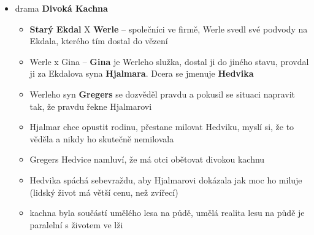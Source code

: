 \begin{itemize}
\item drama \textbf{Divoká Kachna}
	\begin{itemize}
	\item \textbf{Starý Ekdal} X \textbf{Werle} -- společníci ve firmě, Werle svedl své podvody na Ekdala, kterého tím dostal do vězení
	\item Werle x Gina -- \textbf{Gina} je Werleho služka, dostal ji do jiného stavu, provdal ji za Ekdalova syna \textbf{Hjalmara}. Dcera se jmenuje \textbf{Hedvika}
	\item Werleho syn \textbf{Gregers} se dozvěděl pravdu a pokusil se situaci napravit tak, že pravdu řekne Hjalmarovi
	\item Hjalmar chce opustit rodinu, přestane milovat Hedviku, myslí si, že to věděla a nikdy ho skutečně nemilovala
	\item Gregers Hedvice namluví, že má otci obětovat divokou kachnu
	\item Hedvika spáchá sebevraždu, aby Hjalmarovi dokázala jak moc ho miluje (lidský život má větší cenu, než zvířecí)
	\item kachna byla součástí umělého lesa na půdě, umělá realita lesu na půdě je paralelní s životem ve lži
	\end{itemize}
\end{itemize}

